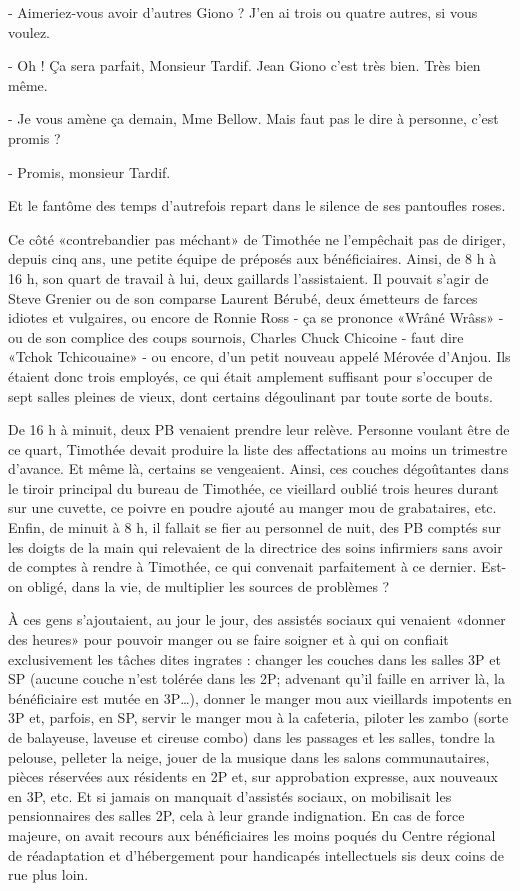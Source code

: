 - Aimeriez-vous avoir d’autres Giono ? J’en ai trois ou quatre autres, si vous voulez.

- Oh ! Ça sera parfait, Monsieur Tardif. Jean Giono c’est très bien. Très bien même.

- Je vous amène ça demain, Mme Bellow. Mais faut pas le dire à personne, c’est promis ?

- Promis, monsieur Tardif.

Et le fantôme des temps d’autrefois repart dans le silence de ses pantoufles roses.

Ce côté «contrebandier pas méchant» de Timothée ne l’empêchait pas de diriger, depuis cinq ans, une petite équipe de préposés aux bénéficiaires. Ainsi, de 8 h à 16 h, son quart de travail à lui, deux gaillards l’assistaient. Il pouvait s’agir de Steve Grenier ou de son comparse Laurent Bérubé, deux émetteurs de farces idiotes et vulgaires, ou encore de Ronnie Ross - ça se prononce «Wrâné Wrâss» - ou de son complice des coups sournois, Charles Chuck Chicoine - faut dire «Tchok Tchicouaine» - ou encore, d’un petit nouveau appelé Mérovée d’Anjou. Ils étaient donc trois employés, ce qui était amplement suffisant pour s’occuper de sept salles pleines de vieux, dont certains dégoulinant par toute sorte de bouts.

De 16 h à minuit, deux PB venaient prendre leur relève. Personne voulant être de ce quart, Timothée devait produire la liste des affectations au moins un trimestre d’avance. Et même là, certains se vengeaient. Ainsi, ces couches dégoûtantes dans le tiroir principal du bureau de Timothée, ce vieillard oublié trois heures durant sur une cuvette, ce poivre en poudre ajouté au manger mou de grabataires, etc. Enfin, de minuit à 8 h, il fallait se fier au personnel de nuit, des PB comptés sur les doigts de la main qui relevaient de la directrice des soins infirmiers sans avoir de comptes à rendre à Timothée, ce qui convenait parfaitement à ce dernier. Est-on obligé, dans la vie, de multiplier les sources de problèmes ?

À ces gens s’ajoutaient, au jour le jour, des assistés sociaux qui venaient «donner des heures» pour pouvoir manger ou se faire soigner et à qui on confiait exclusivement les tâches dites ingrates : changer les couches dans les salles 3P et SP (aucune couche n’est tolérée dans les 2P; advenant qu’il faille en arriver là, la bénéficiaire est mutée en 3P…), donner le manger mou aux vieillards impotents en 3P et, parfois, en SP, servir le manger mou à la cafeteria, piloter les zambo (sorte de balayeuse, laveuse et cireuse combo) dans les passages et les salles, tondre la pelouse, pelleter la neige, jouer de la musique dans les salons communautaires, pièces réservées aux résidents en 2P et, sur approbation expresse, aux nouveaux en 3P, etc. Et si jamais on manquait d’assistés sociaux, on mobilisait les pensionnaires des salles 2P, cela à leur grande indignation. En cas de force majeure, on avait recours aux bénéficiaires les moins poqués du Centre régional de réadaptation et d’hébergement pour handicapés intellectuels sis deux coins de rue plus loin.

